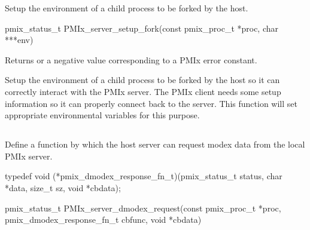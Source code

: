 \summary

Setup the environment of a child process to be forked by the host.

\format

\cspecificstart
\begin{codepar}
pmix_status_t PMIx_server_setup_fork(const pmix_proc_t *proc, char ***env)
\end{codepar}
\cspecificend

\begin{arglist}
\end{arglist}

Returns  or a negative value corresponding to a PMIx error constant.

\descr

Setup the environment of a child process to be forked by the host so it can correctly interact with the PMIx server.
The PMIx client needs some setup information so it can properly connect back to the server.
This function will set appropriate environmental variables for this purpose.


\subsection{}

\summary

Define a function by which the host server can request modex data from the local PMIx server.

\format

\cspecificstart
\begin{codepar}
typedef void (*pmix_dmodex_response_fn_t)(pmix_status_t status,
                                          char *data, size_t sz,
                                          void *cbdata);

pmix_status_t PMIx_server_dmodex_request(const pmix_proc_t *proc,
                                         pmix_dmodex_response_fn_t cbfunc,
                                         void *cbdata)
\end{codepar}
\cspecificend

\begin{arglist}
\end{arglist}

